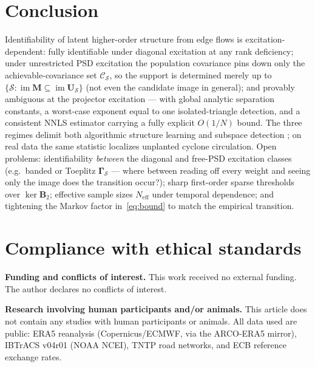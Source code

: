\documentclass{article}
\DeclareMathOperator{\im}{im}
\newcommand{\B}{\bm{B}}
\newcommand{\Scal}{\mathcal{S}}
\newcommand{\Ccal}{\mathcal{C}}
\newcommand{\Gam}{\bm{\Gamma}}
\begin{document}
\section{Conclusion}
Identifiability of latent higher-order structure from edge flows is
excitation-dependent: fully identifiable under diagonal excitation at any
rank deficiency; under unrestricted PSD excitation the population covariance
pins down only the achievable-covariance set $\Ccal_\Scal$, so the support is
determined merely up to $\{\Scal:\im\bm M\subseteq\im\bm U_\Scal\}$ (not even
the candidate image in general); and provably ambiguous at the projector
excitation --- with global analytic separation constants, a worst-case
exponent equal to one isolated-triangle detection, and a consistent NNLS
estimator carrying a fully explicit $O(1/N)$ bound.
The three regimes delimit both algorithmic structure learning
\cite{gurugubelli2024simplicial,buciulea2025learning,hoppe2023representing}
and subspace detection \cite{liu2025matched}; on real data the same
statistic localizes unplanted cyclone circulation. Open problems:
identifiability \emph{between} the diagonal and free-PSD excitation classes
(e.g.\ banded or Toeplitz $\Gam_\Scal$ --- where between reading off every
weight and seeing only the image does the transition occur?); sharp
first-order sparse thresholds over $\ker\B_2$; effective sample sizes
$N_{\mathrm{eff}}$ under temporal dependence; and tightening the Markov
factor in~\eqref{eq:bound} to match the empirical transition.

\clearpage



\section*{Compliance with ethical standards}
\noindent\textbf{Funding and conflicts of interest.} This work received no
external funding. The author declares no conflicts of interest.

\smallskip
\noindent\textbf{Research involving human participants and/or animals.} This
article does not contain any studies with human participants or animals. All
data used are public: ERA5 reanalysis (Copernicus/ECMWF, via the ARCO-ERA5
mirror), IBTrACS v04r01 (NOAA NCEI), TNTP road networks, and ECB reference
exchange rates.
\end{document}

